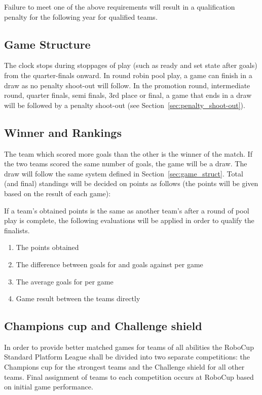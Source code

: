 \documentclass[12pt]{article}
\begin{document}
Failure to meet one of the above requirements will result in a qualification penalty for the following year for qualified teams.

\subsection{Game Structure}

The clock stops during stoppages of play (such as ready and set state after goals) from the quarter-finals onward.  In round robin pool play, a game can finish in a draw as no penalty shoot-out will follow. In the promotion round, intermediate round, quarter finals, semi finals, 3rd place or final, a game that ends in a draw will be followed by a penalty shoot-out (see Section~\ref{sec:penalty_shoot-out}).

\subsection{Winner and Rankings}
\label{sec:rankings}

The team which scored more goals than the other is the winner of the match. If the two teams scored the same number of goals, the game will be a draw. The draw will follow the same system defined in Section~\ref{sec:game_struct}. Total (and final) standings will be decided on points as follows (the points will be given based on the result of each game):


If a team's obtained points is the same as another team's after a round of pool play is complete, the following evaluations will be applied in order to qualify the finalists.

\begin{enumerate}

\item The points obtained

\item The difference between goals for and goals against per game

\item The average goals for per game

\item Game result between the teams directly

\end{enumerate}

\subsection{Champions cup and Challenge shield}
\label{sec:twoCompetitions}
In order to provide better matched games for teams of all abilities the RoboCup Standard Platform League shall be divided into two separate competitions: the Champions cup for the strongest teams and the Challenge shield for all other teams. Final assignment of teams to each competition occurs at RoboCup based on initial game performance.
\end{document}
